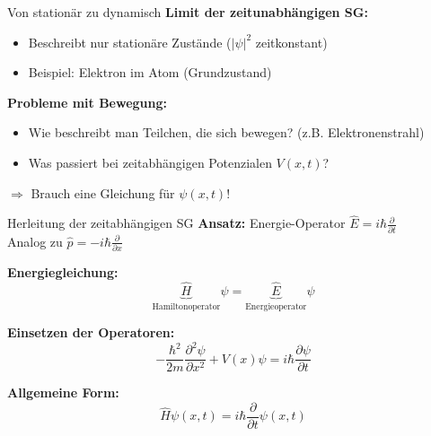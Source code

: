 \begin{frame}{Von stationär zu dynamisch}
    \textbf{Limit der zeitunabhängigen SG:}
    \begin{itemize}
        \item Beschreibt nur \alert{stationäre Zustände} ($|\psi|^2$ zeitkonstant)
        \item Beispiel: Elektron im Atom (Grundzustand)
    \end{itemize}

    \textbf{Probleme mit Bewegung:}
    \begin{itemize}
        \item Wie beschreibt man Teilchen, die sich bewegen? (z.B. Elektronenstrahl)
        \item Was passiert bei zeitabhängigen Potenzialen $V(x,t)$?
    \end{itemize}

    \centering
    \alert{$\Rightarrow$ Brauch eine Gleichung für $\psi(x,t)$!}
\end{frame}

\begin{frame}{Herleitung der zeitabhängigen SG}
    \textbf{Ansatz:} Energie-Operator $\hat{E} = i\hbar\frac{\partial}{\partial t}$\\
    Analog zu $\hat{p} = -i\hbar\frac{\partial}{\partial x}$

    \textbf{Energiegleichung:}
    \[
        \underbrace{\hat{H}}_{\text{Hamiltonoperator}} \psi = \underbrace{\hat{E}}_{\text{Energieoperator}} \psi
    \]

    \textbf{Einsetzen der Operatoren:}
    \[
        -\frac{\hbar^2}{2m}\frac{\partial^2 \psi}{\partial x^2} + V(x)\psi = i\hbar\frac{\partial \psi}{\partial t}
    \]

    \textbf{Allgemeine Form:}
    \[
        \boxed{\hat{H}\psi(x,t) = i\hbar\frac{\partial}{\partial t}\psi(x,t)}
    \]
\end{frame}

